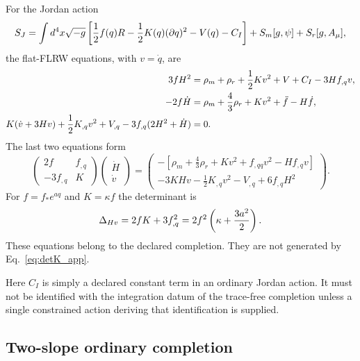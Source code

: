 For the Jordan action
\begin{equation}
 S_J=\int d^4x\sqrt{-g}\left[
 {1\over2}f(q)R-{1\over2}K(q)(\partial q)^2-V(q)-C_I\right]
 +S_m[g,\psi]+S_r[g,A_\mu],
 \label{eq:jordan_action_app}
\end{equation}
the flat-FLRW equations, with $v=\dot q$, are
\begin{align}
 3fH^2={}&\rho_m+\rho_r+{1\over2}Kv^2+V+C_I-3Hf_{,q}v,
 \label{eq:frw_friedmann_app}\\
 -2f\dot H={}&\rho_m+{4\over3}\rho_r+Kv^2+\ddot f-H\dot f,
 \label{eq:frw_raychaudhuri_app}\\
 K(\dot v+3Hv)+{1\over2}K_{,q}v^2+V_{,q}
 -3f_{,q}(2H^2+\dot H)={}&0.
 \label{eq:frw_scalar_app}
\end{align}
The last two equations form
\begin{equation}
 \begin{pmatrix}2f&f_{,q}\\-3f_{,q}&K\end{pmatrix}
 \begin{pmatrix}\dot H\\\dot v\end{pmatrix}
 =
 \begin{pmatrix}
 -[\rho_m+\tfrac43\rho_r+Kv^2+f_{,qq}v^2-Hf_{,q}v]\\
 -3KHv-\tfrac12K_{,q}v^2-V_{,q}+6f_{,q}H^2
 \end{pmatrix}.
 \label{eq:frw_response_matrix_app}
\end{equation}
For $f=f_*e^{aq}$ and $K=\kappa f$ the determinant is
\begin{equation}
 \Delta_{Hv}=2fK+3f_{,q}^2
 =2f^2\left(\kappa+{3a^2\over2}\right).
 \label{eq:frw_response_det_app}
\end{equation}
These equations belong to the declared completion.  They are not generated
by Eq.~\eqref{eq:detK_app}.

Here $C_I$ is simply a declared constant term in an ordinary Jordan action.
It must not be identified with the integration datum of the trace-free
completion unless a single constrained action deriving that identification
is supplied.

\subsection{Two-slope ordinary completion}
\label{app:ir_audit_cc}

